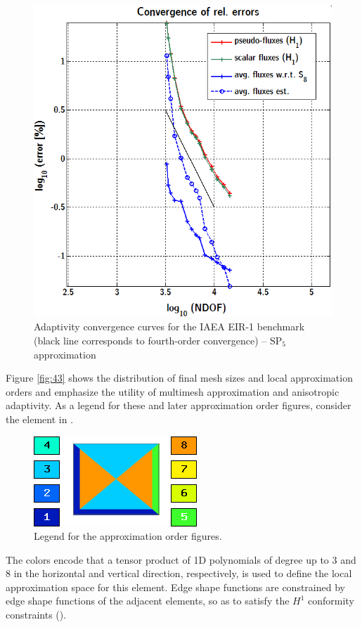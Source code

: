 \begin{figure}[!ht]
\centering
  \includegraphics[scale=.5]{saphir/conv_dof_sp5}
  \caption[Adaptivity convergence curves for the IAEA EIR-1 benchmark]{Adaptivity convergence curves for the 
  IAEA EIR-1 benchmark (black line corresponds to fourth-order convergence) -- $\text{SP}_5$ approximation}
  \label{fig:42}
\end{figure}

Figure \ref{fig:43} shows the distribution of final mesh sizes and local approximation orders and emphasize
the utility of multimesh approximation and anisotropic adaptivity. 
As a legend for these and later approximation order
figures, consider the element in .
\begin{figure}[!ht]
\centering
  \includegraphics[scale=.6]{elem}
  \caption[Legend for the approximation order figures]{Legend for the approximation order figures.}
  \label{fig:44}
\end{figure}
The colors encode that a tensor product of 1D polynomials of degree up to 3 and 8 in the horizontal and vertical
direction, respectively, is used to define the local approximation space for this element. Edge shape functions are
constrained by edge shape functions of the adjacent elements, so as to satisfy the $H^1$ conformity constraints 
(\cite[\S3.5.5]{Hermes-book1}).



